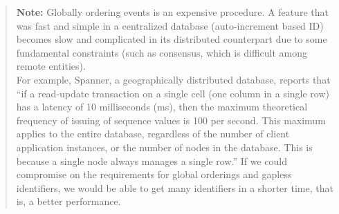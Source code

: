 \begin{quote}
\textbf{Note:} Globally ordering events is an expensive procedure. A feature that was fast and simple in a centralized database (auto-increment based ID) becomes slow and complicated in its distributed counterpart due to some fundamental constraints (such as consensus, which is difficult among remote entities).
\\
For example, Spanner, a geographically distributed database, reports that ``if a read-update transaction on a single cell (one column in a single row) has a latency of 10 milliseconds (ms), then the maximum theoretical frequency of issuing of sequence values is 100 per second. This maximum applies to the entire database, regardless of the number of client application instances, or the number of nodes in the database. This is because a single node always manages a single row.'' If we could compromise on the requirements for global orderings and gapless identifiers, we would be able to get many identifiers in a shorter time, that is, a better performance.
\end{quote}

